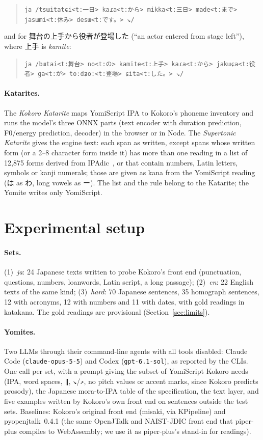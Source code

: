 \documentclass[11pt,a4paper]{article}
\newcommand{\ys}[1]{\mbox{\texttt{#1}}}
\begin{document}
\begin{quote}
\ys{ja /tsɯitatɕi<t:一日> kaɾa<t:から> mikka<t:三日> made<t:まで> jasɯmi<t:休み> desɯ<t:です。> ↘/}
\end{quote}

and for 舞台の上手から役者が登場した (``an actor entered from stage left''), where 上手 is \emph{kamite}:

\begin{quote}
\ys{ja /bɯtai<t:舞台> no<t:の> kamite<t:上手> kaɾa<t:から> jakɯɕa<t:役者> ɡa<t:が> toːdʑoː<t:登場> ɕita<t:した。> ↘/}
\end{quote}

\paragraph{Katarites.} The \emph{Kokoro Katarite} maps YomiScript IPA to Kokoro's phoneme inventory and runs the
model's three ONNX parts (text encoder with duration prediction, F0/energy prediction, decoder) in the browser or in
Node. The \emph{Supertonic Katarite} gives the engine text: each span as written, except spans whose written form (or
a 2--8 character form inside it) has more than one reading in a list of 12{,}875 forms derived from
IPAdic~\citep{ipadic}, or that contain numbers, Latin letters, symbols or kanji numerals; those are given as kana from
the YomiScript reading (は as わ, long vowels as ー). The list and the rule belong to the Katarite; the Yomite writes
only YomiScript.

\section{Experimental setup}\label{sec:setup}

\paragraph{Sets.} (1)~\emph{ja}: 24 Japanese texts written to probe Kokoro's front end (punctuation, questions, numbers,
loanwords, Latin script, a long passage); (2)~\emph{en}: 22 English texts of the same kind; (3)~\emph{hard}: 70
Japanese sentences, 35 homograph sentences, 12 with acronyms, 12 with numbers and 11 with dates, with gold readings in
katakana. The gold readings are provisional (Section~\ref{sec:limits}).

\paragraph{Yomites.} Two LLMs through their command-line agents with all tools disabled: Claude Code
(\texttt{claude-opus-5-5}) and Codex (\texttt{gpt-6.1-sol}), as reported by the CLIs. One call per set, with a prompt
giving the subset of YomiScript Kokoro needs (IPA, word spaces, \ys{‖}, \ys{↘}/\ys{↗}, no pitch values or accent marks,
since Kokoro predicts prosody), the Japanese mora-to-IPA table of the specification, the text layer, and five examples
written by Kokoro's own front end on sentences outside the test sets. Baselines: Kokoro's original front end (misaki,
via KPipeline) and pyopenjtalk~0.4.1 (the same OpenJTalk and NAIST-JDIC front end that piper-plus compiles to
WebAssembly; we use it as piper-plus's stand-in for readings).
\end{document}
